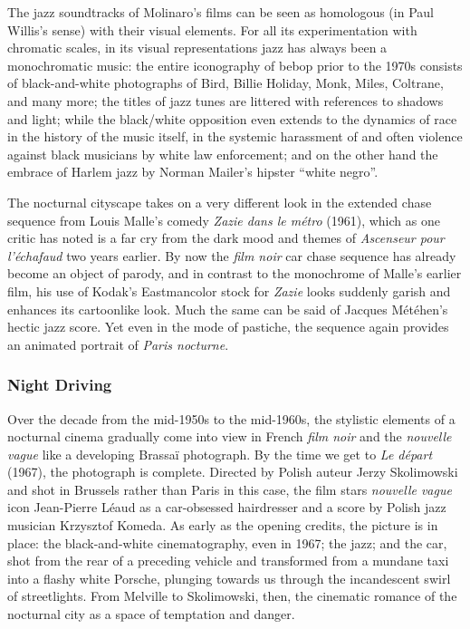 \documentclass[
  letterpaper,
  DIV=11,
  numbers=noendperiod,
  oneside]{scrartcl}
\begin{document}
The jazz soundtracks of Molinaro's films can be seen as homologous (in
Paul Willis's sense) with their visual elements. For all its
experimentation with chromatic scales, in its visual representations
jazz has always been a monochromatic music: the entire iconography of
bebop prior to the 1970s consists of black-and-white photographs of
Bird, Billie Holiday, Monk, Miles, Coltrane, and many more; the titles
of jazz tunes are littered with references to shadows and light; while
the black/white opposition even extends to the dynamics of race in the
history of the music itself, in the systemic harassment of and often
violence against black musicians by white law enforcement; and on the
other hand the embrace of Harlem jazz by Norman Mailer's hipster ``white
negro''.

The nocturnal cityscape takes on a very different look in the extended
chase sequence from Louis Malle's comedy \emph{Zazie dans le métro}
(1961), which as one critic has noted is a far cry from the dark mood
and themes of \emph{Ascenseur pour l'échafaud} two years earlier. By now
the \emph{film noir} car chase sequence has already become an object of
parody, and in contrast to the monochrome of Malle's earlier film, his
use of Kodak's Eastmancolor stock for \emph{Zazie} looks suddenly garish
and enhances its cartoonlike look. Much the same can be said of Jacques
Météhen's hectic jazz score. Yet even in the mode of pastiche, the
sequence again provides an animated portrait of \emph{Paris nocturne}.

\marginnote{\begin{footnotesize}

\end{footnotesize}}

\subsubsection{Night Driving}\label{night-driving}

Over the decade from the mid-1950s to the mid-1960s, the stylistic
elements of a nocturnal cinema gradually come into view in French
\emph{film noir} and the \emph{nouvelle vague} like a developing Brassaï
photograph. By the time we get to \emph{Le départ} (1967), the
photograph is complete. Directed by Polish auteur Jerzy Skolimowski and
shot in Brussels rather than Paris in this case, the film stars
\emph{nouvelle vague} icon Jean-Pierre Léaud as a car-obsessed
hairdresser and a score by Polish jazz musician Krzysztof Komeda. As
early as the opening credits, the picture is in place: the
black-and-white cinematography, even in 1967; the jazz; and the car,
shot from the rear of a preceding vehicle and transformed from a mundane
taxi into a flashy white Porsche, plunging towards us through the
incandescent swirl of streetlights. From Melville to Skolimowski, then,
the cinematic romance of the nocturnal city as a space of temptation and
danger.
\end{document}
